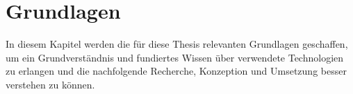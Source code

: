 \chapter{Grundlagen}
\label{chap:grundlagen}
    In diesem Kapitel werden die für diese Thesis relevanten Grundlagen geschaffen, um ein Grundverständnis und 
    fundiertes Wissen über verwendete Technologien zu erlangen und die nachfolgende Recherche, Konzeption und 
    Umsetzung besser verstehen zu können. 


